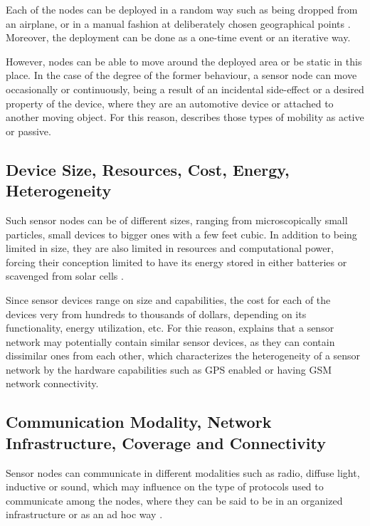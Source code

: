 Each of the nodes can be deployed in a random way such as being dropped
from an airplane, or in a manual fashion at deliberately chosen geographical 
points \cite{sn-intro01}. Moreover, the deployment can be done as a one-time
event or an iterative way. 

However, nodes can be able to move around the deployed area or be static in
this place. In the case of the degree of the former behaviour, a sensor node
can move occasionally or continuously, being a result of an incidental 
side-effect or a desired property of the device, where they are an automotive
device or attached to another moving object. For this reason, \cite{sn-intro01} 
describes those types of mobility as active or passive.

\subsection{Device Size, Resources, Cost, Energy, Heterogeneity}

Such sensor nodes can be of different sizes, ranging from microscopically small
particles, small devices to bigger ones with a few feet cubic. In addition to
being limited in size, they are also limited in resources and computational
power, forcing their conception limited to have its energy stored in either
batteries or scavenged from solar cells \cite{sn-intro01}.

Since sensor devices range on size and capabilities, the cost for each of the
devices very from hundreds to thousands of dollars, depending on its
functionality, energy utilization, etc. For thie reason, \cite{sn-intro01}
explains that a sensor network may potentially contain similar sensor devices,
as they can contain dissimilar ones from each other, which characterizes the heterogeneity 
of a sensor network by the hardware capabilities such as GPS enabled or having
GSM  network connectivity.

\subsection{Communication Modality, Network Infrastructure, Coverage and
Connectivity}
\label{sec:sn-infrastructure}

Sensor nodes can communicate in different modalities such as radio, diffuse
light, inductive or sound, which may influence on the type of protocols used to
communicate among the nodes, where they can be said to be in an organized
infrastructure or as an ad hoc way \cite{sn-intro01}.


